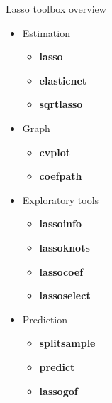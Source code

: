\documentclass{beamer}
\begin{document}
\begin{frame}{Lasso toolbox overview}
	\begin{itemize}
		\item Estimation
		\begin{itemize}
			\item \textbf{lasso}
			\item \textbf{elasticnet}
			\item \textbf{sqrtlasso}
		\end{itemize}
		\item Graph
		\begin{itemize}
			\item \textbf{cvplot}
			\item \textbf{coefpath}
		\end{itemize}
		\item Exploratory tools
		\begin{itemize}
			\item \textbf{lassoinfo}
			\item \textbf{lassoknots}
			\item \textbf{lassocoef}
			\item \textbf{lassoselect}
		\end{itemize}	
		\item Prediction
		\begin{itemize}
			\item \textbf{splitsample}
			\item \textbf{predict}
			\item \textbf{lassogof}
		\end{itemize}
	\end{itemize}
\end{frame}
\end{document}
